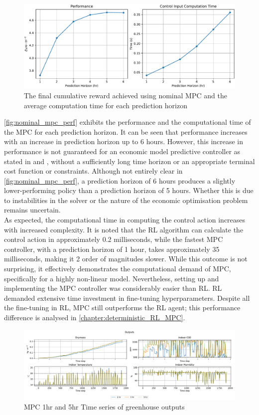 \begin{figure}[H]
	\centering
	\includegraphics[width=\textwidth]{figures/mpc_nominal.pdf}
	\caption{The final cumulative reward achieved using nominal MPC and the average computation time for each prediction horizon}
	\label{fig:nominal_mpc_perf}
\end{figure}

\autoref{fig:nominal_mpc_perf}  exhibits the performance and the computational time of the MPC for each prediction horizon. It can be seen that performance increases with an increase in prediction horizon up to 6 hours. However, this increase in performance is not guaranteed for an economic model predictive controller as stated in \citet{ellisTutorialReviewEconomic2014}  and \citet{amritEconomicOptimizationUsing2011}, without a sufficiently long time horizon or an appropriate terminal cost function or constraints. Although not entirely clear in \autoref{fig:nominal_mpc_perf}, a prediction horizon of 6 hours produces a slightly lower-performing policy than a prediction horizon of 5 hours. Whether this is due to instabilities in the solver or the nature of the economic optimisation problem remains uncertain.\\
As expected, the computational time in computing the control action increases with increased complexity. It is noted that the RL algorithm can calculate the control action in approximately 0.2 milliseconds, while the fastest MPC controller, with a prediction horizon of 1 hour, takes approximately 35 milliseconds, making it 2 order of magnitudes slower. While this outcome is not surprising, it effectively demonstrates the computational demand of MPC, specifically for a highly non-linear model. Nevertheless, setting up and implementing the MPC controller was considerably easier than RL. RL demanded extensive time investment in fine-tuning hyperparameters. Despite all the fine-tuning in RL, MPC still outperforms the RL agent; this performance difference is analysed in \autoref{chapter:deterministic_RL_MPC}. 
\begin{figure}[H]
	\centering
	\includegraphics[width=\textwidth]{figures/mpc_outputs_time_series.pdf}
	\caption{MPC 1hr and 5hr Time series of greenhouse outputs}
	\label{fig:mpc-timeseries-outputs}
\end{figure}

